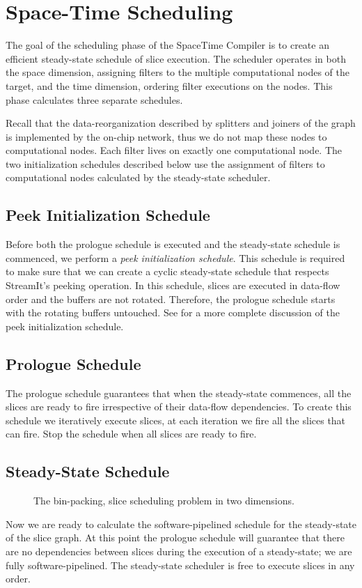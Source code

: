 \section{Space-Time Scheduling}
\label{sec:scheduling}
The goal of the scheduling phase of the SpaceTime Compiler is to
create an efficient steady-state schedule of slice execution.  The
scheduler operates in both the space dimension, assigning filters to
the multiple computational nodes of the target, and the time
dimension, ordering filter executions on the nodes.  This phase calculates
three separate schedules.

Recall that the data-reorganization described by splitters and joiners
of the graph is implemented by the on-chip network, thus we do not map
these nodes to computational nodes.  Each filter lives on exactly one
computational node.  The two initialization schedules described below
use the assignment of filters to computational nodes calculated by the
steady-state scheduler.

\subsection{Peek Initialization Schedule}
Before both the prologue schedule is executed and the steady-state
schedule is commenced, we perform a {\it peek initialization
schedule}.  This schedule is required to make sure that we can create
a cyclic steady-state schedule that respects StreamIt's peeking
operation.  In this schedule, slices are executed in data-flow order
and the buffers are not rotated.  Therefore, the prologue schedule
starts with the rotating buffers untouched.  See
\cite{streamitcc} for a more complete discussion of the peek
initialization schedule.

\subsection{Prologue Schedule}
The prologue schedule guarantees that when the steady-state commences,
all the slices are ready to fire irrespective of their data-flow
dependencies.  To create this schedule we iteratively execute slices,
at each iteration we fire all the slices that can fire.  Stop the
schedule when all slices are ready to fire.

\subsection{Steady-State Schedule}

\begin{figure}
\centering
{}
\caption{The bin-packing, slice scheduling problem in two dimensions.
\protect\label{fig:2d}}
\end{figure}
Now we are ready to calculate the software-pipelined schedule for the
steady-state of the slice graph.  At this point the prologue schedule
will guarantee that there are no dependencies between slices during
the execution of a steady-state; we are fully software-pipelined. The
steady-state scheduler is free to execute slices in any order.

